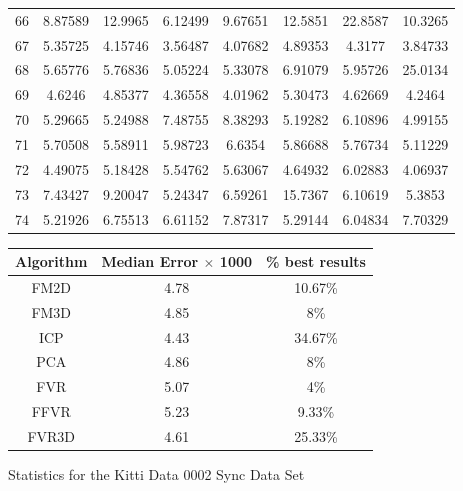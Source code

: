\begin{figure}
\begin{tabular}{cccccccc}
66 & 8.87589 & 12.9965 & 6.12499 & 9.67651 & 12.5851 & 22.8587 & 10.3265\\
67 & 5.35725 & 4.15746 & 3.56487 & 4.07682 & 4.89353 & 4.3177 & 3.84733\\
68 & 5.65776 & 5.76836 & 5.05224 & 5.33078 & 6.91079 & 5.95726 & 25.0134\\
69 & 4.6246 & 4.85377 & 4.36558 & 4.01962 & 5.30473 & 4.62669 & 4.2464\\
70 & 5.29665 & 5.24988 & 7.48755 & 8.38293 & 5.19282 & 6.10896 & 4.99155\\
71 & 5.70508 & 5.58911 & 5.98723 & 6.6354 & 5.86688 & 5.76734 & 5.11229\\
72 & 4.49075 & 5.18428 & 5.54762 & 5.63067 & 4.64932 & 6.02883 & 4.06937\\
73 & 7.43427 & 9.20047 & 5.24347 & 6.59261 & 15.7367 & 6.10619 & 5.3853\\
74 & 5.21926 & 6.75513 & 6.61152 & 7.87317 & 5.29144 & 6.04834 & 7.70329\\
\end{tabular}
\vspace{10mm}
\centering
\begin{tabular}{ccc}
\hline
\textbf{Algorithm} & \textbf{Median Error $\times$ 1000} & \textbf{\% best results}\\ \hline
FM2D	& 4.78 & 10.67\%\\
FM3D	& 4.85 & 8\%\\
ICP	& 4.43 & 34.67\%\\
PCA	& 4.86 & 8\%\\
FVR	& 5.07 & 4\%\\
FFVR	& 5.23 & 9.33\%\\
FVR3D	& 4.61 & 25.33\%\\
\end{tabular}
\caption{Statistics for the Kitti Data 0002 Sync Data Set}
\label{tab:kittidata0002sync}
\end{figure} 



